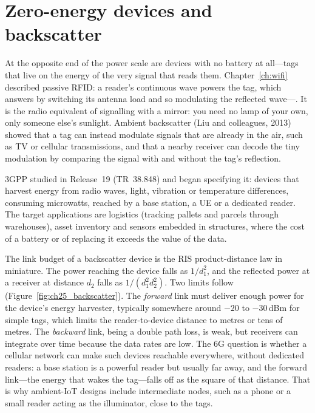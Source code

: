 \section{Zero-energy devices and backscatter}
\label{sec:ch25:ambient}

At the opposite end of the power scale are devices with no battery at all---tags that live on the
energy of the very signal that reads them. Chapter~\ref{ch:wifi} described passive RFID: a reader's
continuous wave powers the tag, which answers by switching its antenna load and so modulating the
reflected wave---. It is the radio equivalent of signalling with a mirror: you need
no lamp of your own, only someone else's sunlight. Ambient backscatter (Liu and colleagues, 2013)
showed that a tag can instead modulate signals that are already in the air, such as TV or cellular
transmissions, and that a nearby receiver can decode the tiny modulation by comparing the signal with
and without the tag's reflection.


3GPP studied  in Release~19 (TR~38.848) and began specifying it: devices that harvest
energy from radio waves, light, vibration or temperature differences, consuming microwatts, reached
by a base station, a UE or a dedicated reader. The target applications are logistics (tracking
pallets and parcels through warehouses), asset inventory and sensors embedded in structures, where
the cost of a battery or of replacing it exceeds the value of the data.

The link budget of a backscatter device is the RIS product-distance law in miniature. The power
reaching the device falls as $1/d_1^2$, and the reflected power at a receiver at distance $d_2$
falls as $1/(d_1^2d_2^2)$. Two limits follow (Figure~\ref{fig:ch25_backscatter}). The \emph{forward}
link must deliver enough power for the device's energy harvester, typically somewhere around $-20$ to
$-30$\,dBm for simple tags, which limits the reader-to-device distance to metres or tens of metres.
The \emph{backward} link, being a double path loss, is weak, but receivers can integrate over time
because the data rates are low. The 6G question is whether a cellular network can make such devices
reachable everywhere, without dedicated readers: a base station is a powerful reader but usually far
away, and the forward link---the energy that wakes the tag---falls off as the square of that
distance. That is why ambient-IoT designs include intermediate nodes, such as a phone or a small
reader acting as the illuminator, close to the tags.

